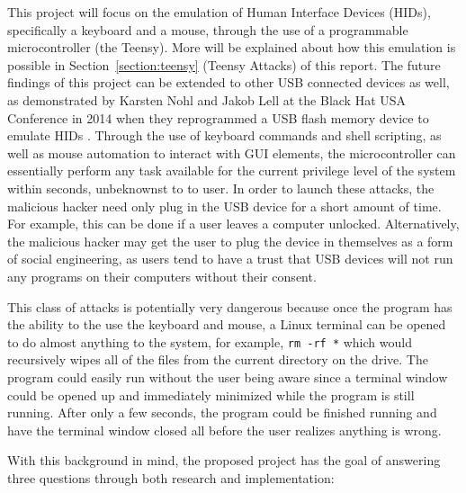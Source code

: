\documentclass[pagenumbers]{ieee}
\begin{document}
This project will focus on the emulation of Human Interface Devices (HIDs), specifically a keyboard and a mouse, through the use of a programmable microcontroller (the Teensy). More will be explained about how this emulation is possible in Section~\ref{section:teensy} (Teensy Attacks) of this report. The future findings of this project can be extended to other USB connected devices as well, as demonstrated by Karsten Nohl and Jakob Lell at the Black Hat USA Conference in 2014 when they reprogrammed a USB flash memory device to emulate HIDs \cite{nohl}. Through the use of keyboard commands and shell scripting, as well as mouse automation to interact with GUI elements, the microcontroller can essentially perform any task available for the current privilege level of the system within seconds, unbeknownst to to user. In order to launch these attacks, the malicious hacker need only plug in the USB device for a short amount of time. For example, this can be done if a user leaves a computer unlocked. Alternatively, the malicious hacker may get the user to plug the device in themselves as a form of social engineering, as users tend to have a trust that USB devices will not run any programs on their computers without their consent.

This class of attacks is potentially very dangerous because once the program has the ability to the use the keyboard and mouse, a Linux terminal can be opened to do almost anything to the system, for example, \texttt{rm -rf *} which would recursively wipes all of the files from the current directory on the drive. The program could easily run without the user being aware since a terminal window could be opened up and immediately minimized while the program is still running. After only a few seconds, the program could be finished running and have the terminal window closed all before the user realizes anything is wrong.

With this background in mind, the proposed project has the goal of answering three questions through both research and implementation:
\end{document}
